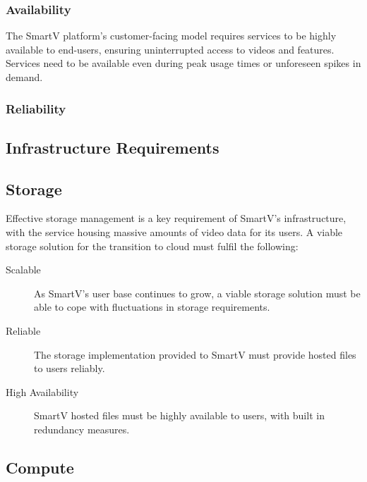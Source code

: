 \documentclass[]{article}
\begin{document}
\subsubsection{Availability}

The SmartV platform's customer-facing model requires services to be highly available to end-users, ensuring uninterrupted access to videos and features. Services need to be available even during peak usage times or unforeseen spikes in demand.


\subsubsection{Reliability}

\subsection{Infrastructure Requirements}


\subsection{Storage}

Effective storage management is a key requirement of SmartV's infrastructure, with the service housing massive amounts of video data for its users. A viable storage solution for the transition to cloud must fulfil the following:

\begin{description}
    \item[Scalable] As SmartV's user base continues to grow, a viable storage solution must be able to cope with fluctuations in storage requirements.
    \item[Reliable] The storage implementation provided to SmartV must provide hosted files to users reliably.
    \item[High Availability] SmartV hosted files must be highly available to users, with built in redundancy measures.
\end{description}



\subsection{Compute}
\end{document}
